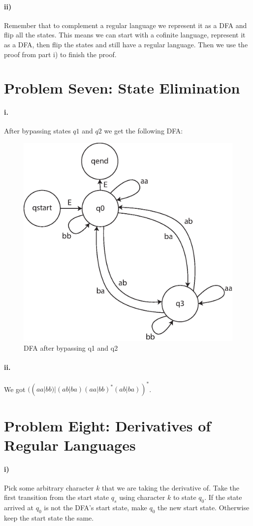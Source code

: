 \documentclass[10pt,letter]{article}
\begin{document}
\paragraph{ii)} Remember that to complement a regular language we represent it as a DFA and flip all the states. This means we can start with a cofinite language, represent it as a DFA, then flip the states and still have a regular language. Then we use the proof from part i) to finish the proof.

\section*{Problem Seven: State Elimination}

\paragraph{i.} After bypassing states $q1$ and $q2$ we get the following DFA:\\

\begin{figure}[h]
\centering
  \includegraphics[width=0.45\linewidth]{7i.eps}
  \caption{DFA after bypassing q1 and q2}
  \label{fig:7i}
\end{figure}

\paragraph{ii.} We got $( (aa|bb) | (ab|ba) (aa|bb)^{*} (ab|ba))^{*}$.

\section*{Problem Eight: Derivatives of Regular Languages}

\paragraph{i)} Pick some arbitrary character $k$ that we are taking the derivative of. Take the first transition from the start state $q_s$ using character $k$ to state $q_0$. If the state arrived at $q_0$ is not the DFA's start state, make $q_0$ the new start state. Otherwise keep the start state the same. 
\end{document}
